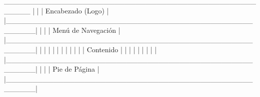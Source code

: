 _____________________________________________________
|                                                     |
|                Encabezado (Logo)                   |
|_____________________________________________________|
|                                                     |
|                  Menú de Navegación                |
|_____________________________________________________|
|                                                     |
|                                                     |
|                                                     |
|                                                     |
|                                                     |
|                    Contenido                         |
|                                                     |
|                                                     |
|                                                     |
|                                                     |
|_____________________________________________________|
|                                                     |
|                  Pie de Página                      |
|_____________________________________________________|

